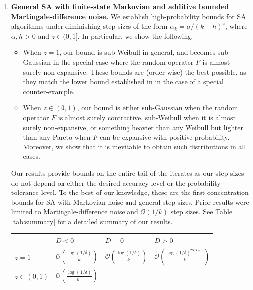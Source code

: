 \documentclass{article}
\begin{document}
\begin{enumerate}
    \item \textbf{General SA with finite-state Markovian and additive bounded Martingale-difference noise.} We establish high-probability bounds for SA algorithms under diminishing step sizes of the form $\alpha_k=\alpha/(k+h)^z$, where $\alpha,h>0$ and $z\in(0,1]$. In particular, we show the following.
    \begin{itemize}
        \item When $z=1$, our bound is sub-Weibull in general, and becomes sub-Gaussian in the special case where the random operator $F$ is almost surely non-expansive. These bounds are (order-wise) the best possible, as they match the lower bound established in \cite{chen2025concentration} in the case of a special counter-example.
        \item When $z\in(0,1)$, our bound is either sub-Gaussian when the random operator $F$ is almost surely contractive, sub-Weibull when it is almost surely non-expansive, or something heavier than any Weibull but lighter than any Pareto when $F$ can be expansive with positive probability. Moreover, we show that it is inevitable to obtain such distributions in all cases. 
    \end{itemize}
    Our results provide bounds on the entire tail of the iterates as our step sizes do not depend on either the desired accuracy level or the probability tolerance level. To the best of our knowledge, these are the first concentration bounds for SA with Markovian noise and general step sizes. Prior results were limited to Martingale-difference noise and $\mathcal{O}(1/k)$ step sizes. See Table \ref{tab:summary} for a detailed summary of our results.
\begin{table}[ht!]
\setlength{\arrayrulewidth}{0.3mm}
\renewcommand{\arraystretch}{1.9}
\begin{center}
\begin{tabular}{|
    >{\centering\arraybackslash}m{1.5cm}||
    >{\centering\arraybackslash}m{2cm}|
    >{\centering\arraybackslash}m{2.5cm}|
    >{\centering\arraybackslash}m{3.5cm}|} 
 \hline
 & $D<0$ 
 & $D = 0$ 
 & $D>0$ \\  
 \hline
 $z=1$
 & $\tilde{\mathcal{O}}\left(\frac{\log(1/\delta)}{k}\right)$
 & $\tilde{\mathcal{O}}\left(\frac{\log(1/\delta)}{k}\right)$
 & $\tilde{\mathcal{O}}\left(\frac{\log(1/\delta)^{2\alpha D+1}}{k}\right)$ \\
 \hline
 $z\in (0,1)$
 & $\tilde{\mathcal{O}}\left(\frac{\log(1/\delta)}{k^z}\right)$

\end{tabular}
\end{center}
\end{table}
\end{enumerate}
\end{document}
